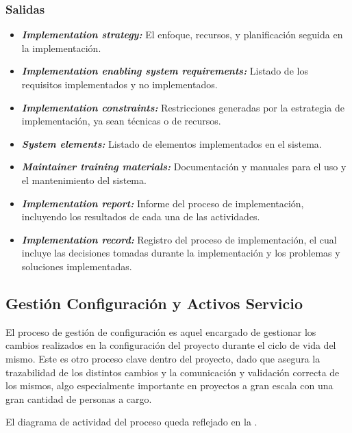 \subsubsection{Salidas}
\begin{itemize}
  \item \textbf{\textit{Implementation strategy:}} El enfoque, recursos, y planificación seguida en la implementación.
  \item \textbf{\textit{Implementation enabling system requirements:}} Listado de los requisitos implementados y no implementados.
  \item \textbf{\textit{Implementation constraints:}} Restricciones generadas por la estrategia de implementación, ya sean técnicas o de recursos.
  \item \textbf{\textit{System elements:}} Listado de elementos implementados en el sistema.
  \item \textbf{\textit{Maintainer training materials:}} Documentación y manuales para el uso y el mantenimiento del sistema.
  \item \textbf{\textit{Implementation report:}} Informe del proceso de implementación, incluyendo los resultados de cada una de las actividades.
  \item \textbf{\textit{Implementation record:}} Registro del proceso de implementación, el cual incluye las decisiones tomadas durante la implementación y los problemas y soluciones implementadas.
\end{itemize}



\subsection{Gestión Configuración y Activos Servicio}  %
El proceso de gestión de configuración es aquel encargado de gestionar los cambios realizados en la configuración del proyecto durante el ciclo de vida del mismo. Este es otro proceso clave dentro del proyecto, dado que asegura la trazabilidad de los distintos cambios y la comunicación y validación correcta de los mismos, algo especialmente importante en proyectos a gran escala con una gran cantidad de personas a cargo.

El diagrama de actividad del proceso queda reflejado en la .



